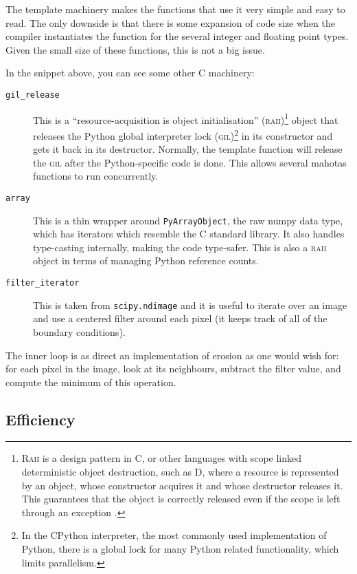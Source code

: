 \documentclass{scrartcl}
\newcommand*{\cpp}{{C\nolinebreak[4]\hspace{-.05em}\raisebox{.4ex}{\tiny\textbf{++}}}}
\let\code\texttt
\begin{document}
The template machinery makes the functions that use it very simple and easy to
read. The only downside is that there is some expansion of code size when the
compiler instantiates the function for the several integer and floating point
types. Given the small size of these functions, this is not a big issue.

In the snippet above, you can see some other \cpp{} machinery:

\begin{description}
\item[\code{gil\_release}] This is a ``resource-acquisition is object
initialisation'' (\textsc{raii})\footnote{\textsc{Raii} is a design pattern in
\cpp{}, or other languages with scope linked deterministic object destruction,
such as D, where a resource is represented by an object, whose constructor
acquires it and whose destructor releases it. This guarantees that the object
is correctly released even if the scope is left through an exception
\citep{Stroustrup1994}.} object that releases the Python global interpreter lock
(\textsc{gil})\footnote{In the CPython interpreter, the most commonly used
implementation of Python, there is a global lock for many Python related
functionality, which limits parallelism.} in its constructor and gets it back
in its destructor. Normally, the template function will release the
\textsc{gil} after the Python-specific code is done. This allows several
mahotas functions to run concurrently.
\item[\code{array}] This is a thin wrapper around \code{PyArrayObject}, the raw
numpy data type, which has iterators which resemble the \cpp{} standard
library. It also handles type-casting internally, making the code type-safer.
This is also a \textsc{raii} object in terms of managing Python reference
counts.
\item[\code{filter\_iterator}] This is taken from \code{scipy.ndimage} and it
is useful to iterate over an image and use a centered filter around each pixel
(it keeps track of all of the boundary conditions).
\end{description}

The inner loop is as direct an implementation of erosion as one would wish for:
for each pixel in the image, look at its neighbours, subtract the filter value,
and compute the minimum of this operation.

\subsection{Efficiency}
\end{document}
